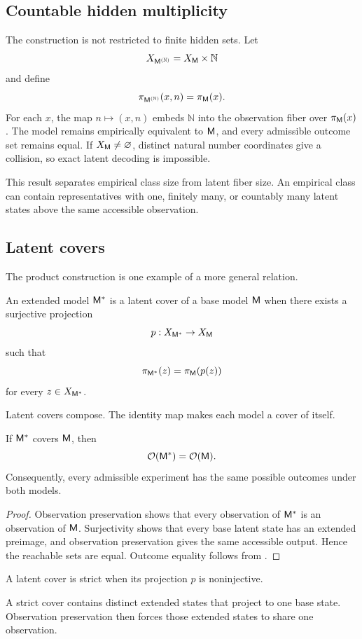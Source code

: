 \subsection{Countable hidden multiplicity}

The construction is not restricted to finite hidden sets. Let
\[
X_{\mathsf M^{(\mathbb N)}}=X_\mathsf M\times\mathbb N
\]
and define
\[
\pi_{\mathsf M^{(\mathbb N)}}(x,n)=\pi_\mathsf M(x).
\]
For each \(x\), the map \(n\mapsto(x,n)\) embeds \(\mathbb N\) into the observation fiber over \(\pi_\mathsf M(x)\). The model remains empirically equivalent to \(\mathsf M\), and every admissible outcome set remains equal. If \(X_\mathsf M\neq\varnothing\), distinct natural number coordinates give a collision, so exact latent decoding is impossible.

This result separates empirical class size from latent fiber size. An empirical class can contain representatives with one, finitely many, or countably many latent states above the same accessible observation.

\subsection{Latent covers}

The product construction is one example of a more general relation.

\begin{definition}
An extended model \(\mathsf M^{\ast}\) is a latent cover of a base model \(\mathsf M\) when there exists a surjective projection
\[
p:X_{\mathsf M^{\ast}}\to X_\mathsf M
\]
such that
\[
\pi_{\mathsf M^{\ast}}(z)=\pi_\mathsf M(p(z))
\]
for every \(z\in X_{\mathsf M^{\ast}}\).
\end{definition}
Latent covers compose. The identity map makes each model a cover of itself.

\begin{theorem}
If \(\mathsf M^{\ast}\) covers \(\mathsf M\), then
\[
\mathcal O(\mathsf M^{\ast})=\mathcal O(\mathsf M).
\]
Consequently, every admissible experiment has the same possible outcomes under both models.
\end{theorem}

\begin{proof}
Observation preservation shows that every observation of \(\mathsf M^{\ast}\) is an observation of \(\mathsf M\). Surjectivity shows that every base latent state has an extended preimage, and observation preservation gives the same accessible output. Hence the reachable sets are equal. Outcome equality follows from .
\end{proof}
\begin{definition}
A latent cover is strict when its projection \(p\) is noninjective.
\end{definition}
A strict cover contains distinct extended states that project to one base state. Observation preservation then forces those extended states to share one observation.

